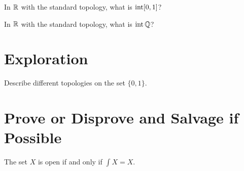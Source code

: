 \documentclass{homework}
\begin{document}
\begin{problem}
  In $\mathbb{R}$ with the standard topology, what is
  $\operatorname{int} [0,1]$?
\end{problem}

\begin{problem}
  In $\mathbb{R}$ with the standard topology, what is
  $\operatorname{int} \mathbb{Q}$?
\end{problem}

\section{Exploration}

\begin{problem}
  Describe different topologies on the set $\{ 0, 1 \}$.
\end{problem}

\section{Prove or Disprove and Salvage if Possible}

\begin{problem}
  The set $X$ is open if and only if $\int X = X$.
\end{problem}
\end{document}
